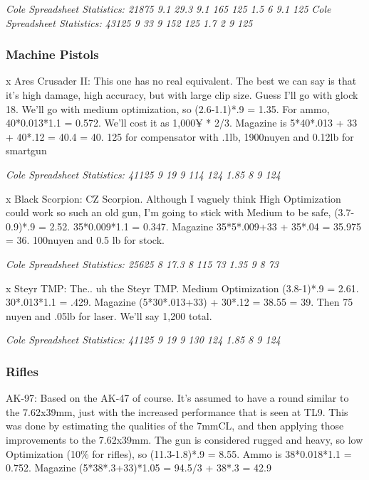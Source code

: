 \begin{multicols*}{2}
	\textit{\textcolor{OliveGreen}{Cole Spreadsheet Statistics: 21875 9.1 29.3 9.1 165 125 1.5 6 9.1 125}}
	\textit{\textcolor{OliveGreen}{Cole Spreadsheet Statistics: 43125 9 33 9 152 125 1.7 2 9 125}}
	
	\subsubsection{Machine Pistols}
	
	x Ares Crusader II: This one has no real equivalent. The best we can say is that it's high damage, high accuracy, but with large clip size. Guess I'll go with glock 18. We'll go with medium optimization, so (2.6-1.1)*.9 = 1.35. For ammo, 40*0.013*1.1 = 0.572. We'll cost it as 1,000¥ * 2/3. Magazine is 5*40*.013 + 33 + 40*.12 = 40.4 = 40. 125 for compensator with .1lb, 1900nuyen and 0.12lb for smartgun
	
	\textit{\textcolor{OliveGreen}{Cole Spreadsheet Statistics: 41125 9 19 9 114 124 1.85 8 9 124}}
	
	x Black Scorpion: CZ Scorpion. Although I vaguely think High Optimization could work so such an old gun, I'm going to stick with Medium to be safe, (3.7-0.9)*.9 = 2.52. 35*0.009*1.1 = 0.347. Magazine 35*5*.009+33 + 35*.04 = 35.975 = 36. 100nuyen and 0.5 lb for stock.
	
	\textit{\textcolor{OliveGreen}{Cole Spreadsheet Statistics: 25625 8 17.3 8 115 73 1.35 9 8 73}}
	
	x Steyr TMP: The.. uh the Steyr TMP. Medium Optimization (3.8-1)*.9 = 2.61. 30*.013*1.1 = .429. Magazine (5*30*.013+33) + 30*.12 = 38.55 = 39. Then 75 nuyen and .05lb for laser. We'll say 1,200 total.
	
	\textit{\textcolor{OliveGreen}{Cole Spreadsheet Statistics: 41125 9 19 9 130 124 1.85 8 9 124}}
	
	\subsubsection{Rifles}
	
	AK-97: Based on the AK-47 of course. It's assumed to have a round similar to the 7.62x39mm, just with the increased performance that is seen at TL9. This was done by estimating the qualities of the 7mmCL, and then applying those improvements to the 7.62x39mm. The gun is considered rugged and heavy, so low Optimization (10\% for rifles), so (11.3-1.8)*.9 = 8.55. Ammo is 38*0.018*1.1 = 0.752. Magazine (5*38*.3+33)*1.05 = 94.5/3 + 38*.3 = 42.9
	

\end{multicols*}
